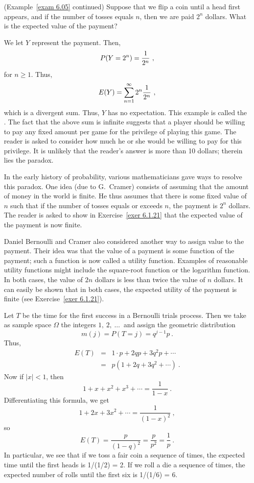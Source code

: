 \begin{example}(Example~\ref{exam 6.05} continued)\label{exam 6.055} Suppose
that we flip a coin until a head first appears, and if the number of tosses equals
$n$, then we are paid $2^n$ dollars.  What is the expected value of the payment?
\par We let $Y$ represent the payment.  Then, 
$$P(Y = 2^n) = {1\over{2^n}}\ ,$$ for $n \ge 1$.  Thus,
$$E(Y) = \sum_{n = 1}^\infty 2^n {1\over{2^n}}\ ,$$ which is a divergent sum.  Thus,
$Y$ has no expectation.  This example is called the  .
The fact that the above sum is infinite suggests that a player should be willing to
pay any fixed amount per game for the privilege of playing this game. The reader is
asked to consider how much he or she would be willing to pay for this privilege.  It
is unlikely that the reader's answer is more than 10 dollars; therein lies the
paradox.
\par In the early history of probability, various mathematicians gave ways to resolve
this paradox.  One idea (due to G.~Cramer) consists of assuming that the amount 
of money in the world is finite.  He thus assumes that there is some fixed value of $n$ such
that if the number of tosses equals or exceeds $n$, the payment is $2^n$ dollars. 
The reader is asked to show in Exercise~\ref{exer 6.1.21} that the expected value of
the payment is now finite.
\par Daniel Bernoulli and Cramer also considered another way to 
assign value to the payment.  Their idea was that the value of a payment is some function of the
payment; such a function is now called a utility function.   Examples of
reasonable utility functions might include the square-root function or the logarithm function.  In
both cases, the value of $2n$ dollars is less than twice the value of $n$ dollars.  It can
easily be shown that in both cases, the expected utility of the payment is finite (see
Exercise~\ref{exer 6.1.21}).
\end{example}

\begin{example}\label{exam 6.8} Let $T$ be the time for the first success in a
Bernoulli trials process.  Then we take as sample space $\Omega$ the integers
$1,~2,~\ldots\ $ and assign the geometric distribution
$$ m(j) = P(T = j) = q^{j - 1}p\ . $$  Thus,
\begin{eqnarray*}  E(T) & = & 1 \cdot p + 2qp + 3q^2p +\cdots \\
     & = & p(1 + 2q + 3q^2 +\cdots )\ .
\end{eqnarray*}  Now if $|x| < 1$, then
$$ 1 + x + x^2 + x^3 + \cdots = \frac 1{1 - x}\ .$$  Differentiating this formula, we
get
$$ 1 + 2x + 3x^2 +\cdots = \frac 1{(1 - x)^2}\ ,$$  so
$$ E(T) = \frac p{(1 - q)^2} = \frac p{p^2} = \frac 1p\ .$$  In particular, we see
that if we toss a fair coin a sequence of times, the expected time until the first
heads is 1/(1/2) = 2.  If we roll a die a sequence of times, the expected number of
rolls until the first six is 1/(1/6) = 6.
\end{example}

